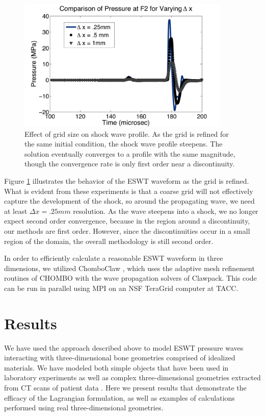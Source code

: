 \documentclass{article}
\begin{document}
\begin{figure}[t]
\begin{center}
\includegraphics[height=2.5in]{variable_deltax_pressure.pdf}
\caption{
\label{fig:steepening}
Effect of grid size on shock wave profile.  As the grid is refined for the same initial condition, the shock wave profile steepens. The solution eventually converges to a profile with the same magnitude, though the convergence rate is only first order near a discontinuity. }
\end{center}
\end{figure}
Figure \ref{fig:steepening} illustrates the behavior of the ESWT waveform as the grid is refined.  What is evident from these experiments is that a coarse grid will not effectively capture the development of the shock, so around the propagating wave, we need at least $\Delta x = .25mm$ resolution.  As the wave steepens into a shock, we no longer expect second order convergence, because in the region around a discontinuity, our methods are first order.  However, since the discontinuities occur in a small region of the domain, the overall methodology is still second order.  

In order to efficiently calculate a reasonable ESWT waveform in three dimensions, we utilized ChomboClaw 
\cite{chomboclaw}, which uses the adaptive mesh refinement routines of CHOMBO with the wave 
propagation solvers of Clawpack.  This code can be run in parallel using MPI on an NSF
TeraGrid computer at TACC.  

\section{Results}
\label{sec:results}
We have used the approach described above to model ESWT pressure waves interacting with three-dimensional bone 
geometries comprised of idealized materials.  We have modeled both simple objects 
that have been used in laboratory experiments \cite{amath_apl_nonunion}
as well as complex three-dimensional geometries
extracted from CT scans of patient data \cite{kfagnan_mchang_ho}.  Here we present 
results that demonstrate the efficacy of the Lagrangian formulation, as well as examples of calculations 
performed using real three-dimensional geometries.  
\end{document}
